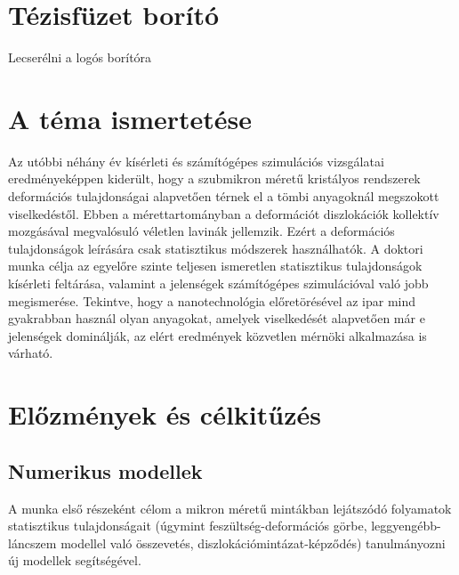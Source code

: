 \documentclass[a5paper,twoside,10pt]{article}
\begin{document}

\section*{Tézisfüzet borító}
Lecserélni a logós borítóra
\pagebreak

\section*{A téma ismertetése}

Az utóbbi néhány év kísérleti és számítógépes szimulációs vizsgálatai eredményeképpen kiderült, hogy a szubmikron méretű kristályos rendszerek deformációs tulajdonságai alapvetően térnek el a tömbi anyagoknál megszokott viselkedéstől. Ebben a mérettartományban a deformációt diszlokációk kollektív mozgásával megvalósuló véletlen lavinák jellemzik\cite{Dimiduk1188}. Ezért a deformációs tulajdonságok leírására csak statisztikus módszerek használhatók. A doktori munka célja az egyelőre szinte teljesen ismeretlen statisztikus tulajdonságok kísérleti feltárása, valamint a jelenségek számítógépes szimulációval való jobb megismerése. Tekintve, hogy a nanotechnológia előretörésével az ipar mind gyakrabban használ olyan anyagokat, amelyek viselkedését alapvetően már e jelenségek dominálják, az elért eredmények közvetlen mérnöki alkalmazása is várható.

\section*{Előzmények és célkitűzés}
\subsection*{Numerikus modellek}

A munka első részeként célom a mikron méretű mintákban lejátszódó folyamatok statisztikus tulajdonságait (úgymint feszültség-deformációs görbe, leggyengébb-láncszem modellel való összevetés, diszlokációmintázat-képződés) tanulmányozni új modellek segítségével.
\end{document}
